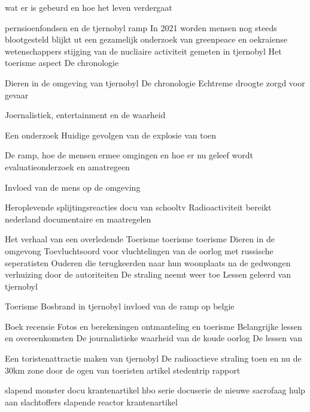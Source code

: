 \cite{rivmTjernobyl}

\cite{andereTijdenTjernobyl}
wat er is gebeurd en hoe het leven verdergaat

\cite{kingskey19042022tjernobyl}
pernsioenfondsen en de tjernobyl ramp
In 2021 worden mensen nog steeds blootgesteld blijkt ut een gezamelijk onderzoek van greenpeace en oekraiense wetenschappers
stijging van de nucliaire activiteit gemeten in tjernobyl
Het toerisme  aspect
De chronologie

\cite{erikbork26042023reactor4}

\cite{nosTjernobyl30jaarlater}
Dieren in de omgeving van tjernobyl
De chronologie
Echtreme droogte zorgd voor gevaar

\cite{knmi04052021tjernobylbosbrand}

\cite{dodonovaKVIRisicoTjernobyl}
Joernalistiek, entertainment en de waarheid

\cite{dumarey04062020verhaalTjernobylWaarheid}
Een onderzoek
Huidige gevolgen van de explosie van toen

\cite{sparkesNewScientistTjernoby}
De ramp, hoe de mensen ermee omgingen en hoe er nu geleef wordt
evaluatieonderzoek en amatregeen

\cite{kernenergiened26041986chronologiemaatregelen}

\cite{mapszoneReactor}
Invloed van de mens op de omgeving

\cite{}
Heroplevende splijtingsreacties
docu van schooltv
Radioactiviteit bereikt nederland
documentaire en maatregelen

\cite{kernhistoriek15062021tjernobyl}
Het verhaal van een overledende
Toerisme
toerisme
toerisme
Dieren in de omgevong
Toevluchtsoord voor vluchtelingen van de oorlog met russische seperatisten
Ouderen die terugkeerden naar hun woonplaats na de gedwongen verhuizing door de autoriteiten
De straling neemt weer toe
Lessen geleerd van tjernobyl

\cite{nucleairforumFeitenTjernobyl}
Toerisme
Bosbrand in tjernobyl
invloed van de ramp op belgie

\cite{kernongevalTjernobylFancGov}
Boek recensie
Fotos en berekeningen
ontmanteling en toerisme
Belangrijke lessen en overeenkomsten
De journalistieke waarheid van de koude oorlog
De lessen van

\cite{arendswolters062019lessenTjernobyl}
Een toristenattractie maken van tjernobyl
De radioactieve straling toen en nu
de 30km zone door de ogen van toeristen
artikel
stedentrip
rapport

\cite{damveld08052020tjernobyl}
slapend monster
docu
krantenartikel
hbo serie
docuserie
de  nieuwe sacrofaag
hulp aan slachtoffers
slapende reactor
krantenartikel


